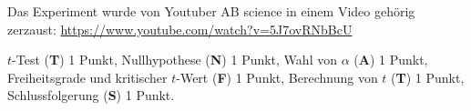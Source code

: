 \begin{diskussion}
Das Experiment wurde von Youtuber AB science in einem Video gehörig zerzaust: 
\url{https://www.youtube.com/watch?v=5J7ovRNbBcU}
\end{diskussion}

\begin{bewertung}
$t$-Test ({\bf T}) 1 Punkt,
Nullhypothese ({\bf N}) 1 Punkt,
Wahl von $\alpha$ ({\bf A}) 1 Punkt,
Freiheitsgrade und kritischer $t$-Wert ({\bf F}) 1 Punkt,
Berechnung von $t$ ({\bf T}) 1 Punkt,
Schlussfolgerung ({\bf S}) 1 Punkt.
\end{bewertung}

